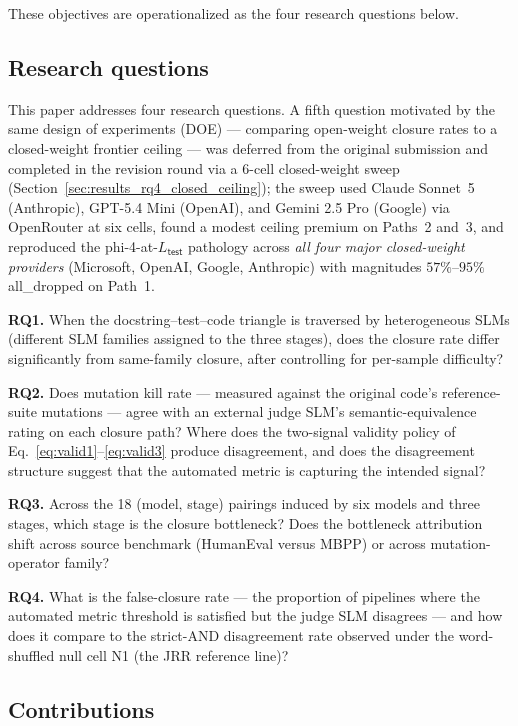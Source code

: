 These objectives are operationalized as the four research questions below.

\subsection{Research questions}
\label{sec:research_questions}

This paper addresses four research questions. A fifth question motivated by the same design of experiments (DOE) --- comparing open-weight closure rates to a closed-weight frontier ceiling --- was deferred from the original submission and completed in the revision round via a 6-cell closed-weight sweep (Section~\ref{sec:results_rq4_closed_ceiling}); the sweep used Claude Sonnet~5 (Anthropic), GPT-5.4 Mini (OpenAI), and Gemini 2.5 Pro (Google) via OpenRouter at six cells, found a modest ceiling premium on Paths~2 and~3, and reproduced the phi-4-at-$L_{\textsf{test}}$ pathology across \emph{all four major closed-weight providers} (Microsoft, OpenAI, Google, Anthropic) with magnitudes $57\%$--$95\%$ \textsf{all\_dropped} on Path~1.

\textbf{RQ1.} When the docstring--test--code triangle is traversed by heterogeneous SLMs (different SLM families assigned to the three stages), does the closure rate differ significantly from same-family closure, after controlling for per-sample difficulty?

\textbf{RQ2.} Does mutation kill rate --- measured against the original code's reference-suite mutations --- agree with an external judge SLM's semantic-equivalence rating on each closure path? Where does the two-signal validity policy of Eq.~\ref{eq:valid1}--\ref{eq:valid3} produce disagreement, and does the disagreement structure suggest that the automated metric is capturing the intended signal?

\textbf{RQ3.} Across the 18 (model, stage) pairings induced by six models and three stages, which stage is the closure bottleneck? Does the bottleneck attribution shift across source benchmark (HumanEval versus MBPP) or across mutation-operator family?

\textbf{RQ4.} What is the false-closure rate --- the proportion of pipelines where the automated metric threshold is satisfied but the judge SLM disagrees --- and how does it compare to the strict-AND disagreement rate observed under the word-shuffled null cell N1 (the JRR reference line)?

\subsection{Contributions}

